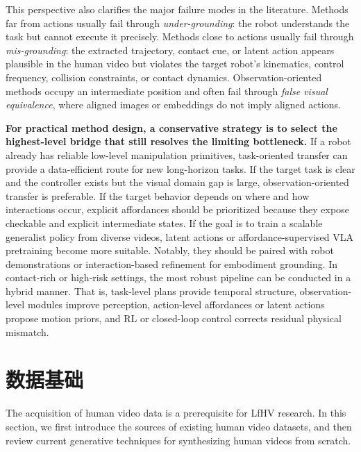 \documentclass[Afour,sageh,times]{sagej}
\begin{document}
This perspective also clarifies the major failure modes in the literature. Methods far from actions usually fail through \textit{under-grounding}: the robot understands the task but cannot execute it precisely. Methods close to actions usually fail through \textit{mis-grounding}: the extracted trajectory, contact cue, or latent action appears plausible in the human video but violates the target robot's kinematics, control frequency, collision constraints, or contact dynamics. Observation-oriented methods occupy an intermediate position and often fail through \textit{false visual equivalence}, where aligned images or embeddings do not imply aligned actions. 

\textbf{For practical method design, a conservative strategy is to select the highest-level bridge that still resolves the limiting bottleneck.} If a robot already has reliable low-level manipulation primitives, task-oriented transfer can provide a data-efficient route for new long-horizon tasks. If the target task is clear and the controller exists but the visual domain gap is large, observation-oriented transfer is preferable. If the target behavior depends on where and how interactions occur, explicit affordances should be prioritized because they expose checkable and explicit intermediate states. If the goal is to train a scalable generalist policy from diverse videos, latent actions or affordance-supervised VLA pretraining become more suitable. Notably, they should be paired with robot demonstrations or interaction-based refinement for embodiment grounding. In contact-rich or high-risk settings, the most robust pipeline can be conducted in a hybrid manner. That is, task-level plans provide temporal structure, observation-level modules improve perception, action-level affordances or latent actions propose motion priors, and RL or closed-loop control corrects residual physical mismatch.






\section{数据基础} \label{sec:data_foundations}

The acquisition of human video data is a prerequisite for LfHV research. In this section, we first introduce the sources of existing human video datasets, and then review current generative techniques for synthesizing human videos from scratch.
\end{document}
